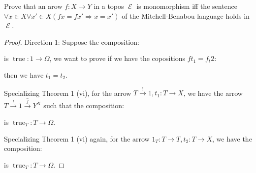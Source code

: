 \documentclass[a4paper]{article}
\DeclareMathOperator{\E}{\mathcal E}
\DeclareMathOperator{\true}{\text {true}}
\begin{document}
\begin{question}
    Prove that an arow $f:X\to Y$ in a topos $\E$ is monomorphism iff the sentence $\forall x\in X \forall x'\in X(fx=fx'\Rightarrow x = x')$ of the Mitchell-Benabou language holds in $\E$.
\end{question}
\begin{proof}
    Direction 1:
    Suppose the composition:
    \begin{center}
    \end{center}
    is $\true:1\to \Omega$, we want to prove if we have the copositions $ft_1=f_t2$:
    \begin{center}
    \end{center}
    then we have $t_1 = t_2$.

    Specializing Theorem 1 (vi), for the arrow $T \overset{!}\to 1,t_1:T\to X$, we have the arrow $T\overset{!}\to 1\overset{\hat{f}}\to Y^X$ such that the composition:

    \begin{center}
    \end{center}

    is $\true_T:T\to \Omega$.

    Specializing Theorem 1 (vi) again, for the arrow $1_T:T\to T,t_2:T\to X$, we have the composition:
    \begin{center}
    \end{center}

    is $\true_T:T\to \Omega$.


\end{proof}
\end{document}
